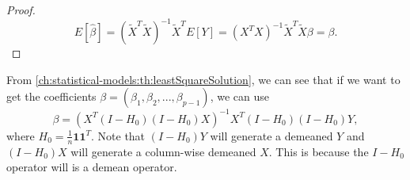 \begin{refsection}
\begin{proof}
	$$E[\hat{\beta}] = (\tilde{X}^T\tilde{X})^{-1}\tilde{X}^T E[Y] = (X^TX)^{-1}\tilde{X}^T\tilde{X}\beta = \beta.$$
\end{proof}

\begin{remark}
From \autoref{ch:statistical-models:th:leastSquareSolution}, we can see that if we want to get the coefficients $\beta = (\beta_1,\beta_2,...,\beta_{p-1})$, we can use
$$\beta = (X^T(I-H_{0})(I-H_{0})X)^{-1}X^T(I - H_{0})(I - H_{0})Y,$$
where $H_{0} = \frac{1}{n}\bm{1}\bm{1}^T$.
Note that $(I - H_{0})Y$ will generate a demeaned $Y$ and $(I - H_{0})X$ will generate a column-wise demeaned $X$. This is because the $I - H_0$ operator will is a demean operator.
\end{remark}




\end{refsection}

